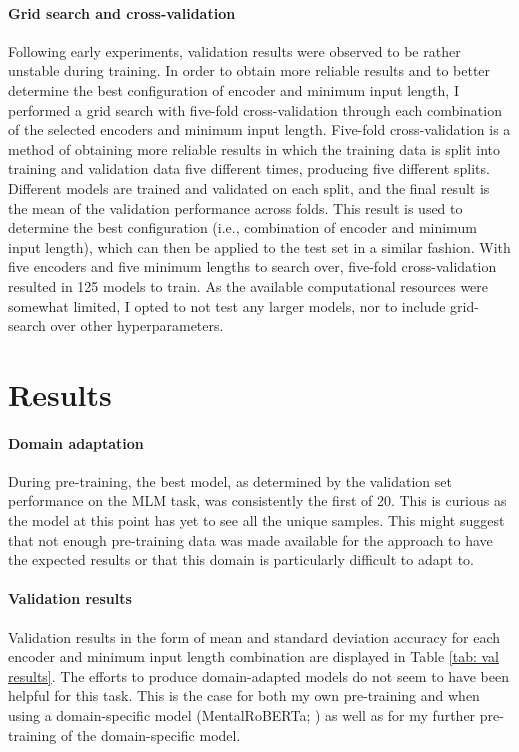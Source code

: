 \documentclass[12pt]{report}
\begin{document}
\paragraph*{Grid search and cross-validation}
Following early experiments, validation results were observed to be rather unstable during training.
In order to obtain more reliable results and to better determine the best configuration of encoder and minimum input length, I performed a grid search with five-fold cross-validation through each combination of the selected encoders and minimum input length.
Five-fold cross-validation is a method of obtaining more reliable results in which the training data is split into training and validation data five different times, producing five different splits.
Different models are trained and validated on each split, and the final result is the mean of the validation performance across folds.
This result is used to determine the best configuration (i.e., combination of encoder and minimum input length), which can then be applied to the test set in a similar fashion.
With five encoders and five minimum lengths to search over, five-fold cross-validation resulted in 125 models to train.
As the available computational resources were somewhat limited, I opted to not test any larger models, nor to include grid-search over other hyperparameters.

\section{Results}
\paragraph*{Domain adaptation}
During pre-training, the best model, as determined by the validation set performance on the MLM task, was consistently the first of 20.
This is curious as the model at this point has yet to see all the unique samples.
This might suggest that not enough pre-training data was made available for the approach to have the expected results or that this domain is particularly difficult to adapt to.

\paragraph*{Validation results}
Validation results in the form of mean and standard deviation accuracy for each encoder and minimum input length combination are displayed in Table \ref{tab: val results}.
The efforts to produce domain-adapted models do not seem to have been helpful for this task.
This is the case for both my own pre-training and when using a domain-specific model (MentalRoBERTa; ) as well as for my further pre-training of the domain-specific model.
\end{document}
